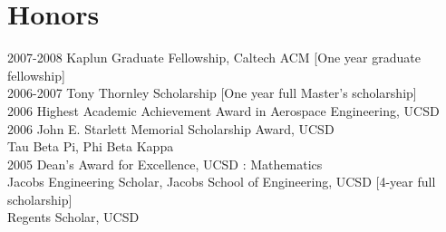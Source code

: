 \documentclass[12pt]{article}
\begin{document}


\section*{Honors}
2007-2008 Kaplun Graduate Fellowship, Caltech ACM [One year graduate fellowship]\\
2006-2007 Tony Thornley Scholarship [One year full Master's scholarship] \\
2006 Highest Academic Achievement Award in Aerospace Engineering, UCSD \\	
2006 John E. Starlett Memorial Scholarship Award, UCSD \\
Tau Beta Pi, Phi Beta Kappa \\	
2005 Dean's Award for Excellence, UCSD : Mathematics \\ 	
Jacobs Engineering Scholar, Jacobs School of Engineering, UCSD [4-year full scholarship]\\ 	
Regents Scholar, UCSD \\
\end{document}
